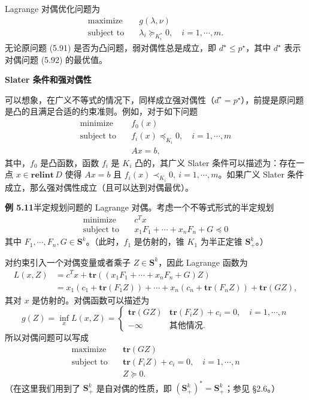 \documentclass[UTF8, 12pt, fontset=fandol, oneside]{ctexart}
\begin{document}
Lagrange 对偶优化问题为
\begin{equation}
\begin{aligned}
\text{maximize}\quad & g(\lambda,\nu)\\
\text{subject to}\quad & \lambda_i\succeq_{K_i^\ast}0,\quad i=1,\cdots,m.
\end{aligned}
\tag{5.92}
\end{equation}
无论原问题 (5.91) 是否为凸问题，弱对偶性总是成立，即 $d^\star\leq p^\star$，其中 $d^\star$ 表示对偶问题 (5.92) 的最优值。

\noindent\textbf{Slater 条件和强对偶性}

可以想象，在广义不等式的情况下，同样成立强对偶性（$d^\star=p^\star$），前提是原问题是凸的且满足合适的约束准则。例如，对于如下问题
\[
\begin{aligned}
\text{minimize}\quad & f_0(x)\\
\text{subject to}\quad & f_i(x)\preceq_{K_i}0,\quad i=1,\cdots,m\\
& Ax=b,
\end{aligned}
\]
其中，$f_0$ 是凸函数，函数 $f_i$ 是 $K_i$ 凸的，其广义 Slater 条件可以描述为：存在一点 $x\in\mathbf{relint}\,D$ 使得 $Ax=b$ 且 $f_i(x)\prec_{K_i}0,\ i=1,\cdots,m$。如果广义 Slater 条件成立，那么强对偶性成立（且可以达到对偶最优）。

\noindent\textbf{例 5.11}\quad 半定规划问题的 Lagrange 对偶。考虑一个不等式形式的半定规划
\begin{equation}
\begin{aligned}
\text{minimize}\quad & c^Tx\\
\text{subject to}\quad & x_1F_1+\cdots+x_nF_n+G\preceq 0
\end{aligned}
\tag{5.93}
\end{equation}
其中 $F_1,\cdots,F_n,G\in\mathbf{S}^k$。（此时，$f_1$ 是仿射的，锥 $K_1$ 为半正定锥 $\mathbf{S}_+^k$。）

对约束引入一个对偶变量或者乘子 $Z\in\mathbf{S}^k$，因此 Lagrange 函数为
\[
\begin{aligned}
L(x,Z)
&=c^Tx+\mathbf{tr}((x_1F_1+\cdots+x_nF_n+G)Z)\\
&=x_1(c_1+\mathbf{tr}(F_1Z))+\cdots+x_n(c_n+\mathbf{tr}(F_nZ))+\mathbf{tr}(GZ),
\end{aligned}
\]
其对 $x$ 是仿射的。对偶函数可以描述为
\[
g(Z)=\inf_x L(x,Z)=
\begin{cases}
\mathbf{tr}(GZ) & \mathbf{tr}(F_iZ)+c_i=0,\quad i=1,\cdots,n\\
-\infty & \text{其他情况}.
\end{cases}
\]
所以对偶问题可以写成
\[
\begin{aligned}
\text{maximize}\quad & \mathbf{tr}(GZ)\\
\text{subject to}\quad & \mathbf{tr}(F_iZ)+c_i=0,\quad i=1,\cdots,n\\
& Z\succeq 0.
\end{aligned}
\]
（在这里我们用到了 $\mathbf{S}_+^k$ 是自对偶的性质，即 $(\mathbf{S}_+^k)^\ast=\mathbf{S}_+^k$；参见 §2.6。）
\end{document}
